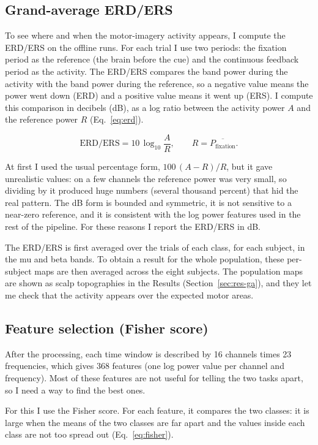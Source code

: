 \documentclass[10pt,twocolumn,a4paper]{article}
\begin{document}
\subsection{Grand-average ERD/ERS}
\label{sec:erd}
To see where and when the motor-imagery activity appears, I compute the ERD/ERS
on the offline runs. For each trial I use two periods: the fixation period as the
reference (the brain before the cue) and the continuous feedback period as the
activity. The ERD/ERS compares the band power during the activity with the band
power during the reference, so a negative value means the power went down (ERD)
and a positive value means it went up (ERS). I compute this comparison in
decibels (dB), as a log ratio between the activity power $A$ and the reference
power $R$ (Eq.~\ref{eq:erd}).

\begin{equation}
\label{eq:erd}
\mathrm{ERD/ERS} = 10\,\log_{10}\!\frac{A}{R},
\qquad R = \overline{P_{\text{fixation}}} .
\end{equation}

At first I used the usual percentage form, $100\,(A-R)/R$, but it gave
unrealistic values: on a few channels the reference power was very small, so
dividing by it produced huge numbers (several thousand percent) that hid the real
pattern. The dB form is bounded and symmetric, it is not sensitive to a
near-zero reference, and it is consistent with the log power features used in the
rest of the pipeline. For these reasons I report the ERD/ERS in dB.

The ERD/ERS is first averaged over the trials of each class, for each subject, in
the mu and beta bands. To obtain a result for the whole population, these
per-subject maps are then averaged across the eight subjects. The population maps
are shown as scalp topographies in the Results (Section~\ref{sec:res-ga}), and
they let me check that the activity appears over the expected motor areas.

\subsection{Feature selection (Fisher score)}
\label{sec:fisher}
After the processing, each time window is described by 16 channels times 23
frequencies, which gives 368 features (one log power value per channel and
frequency). Most of these features are not useful for telling the two tasks
apart, so I need a way to find the best ones.

For this I use the Fisher score. For each feature, it compares the two classes:
it is large when the means of the two classes are far apart and the values inside
each class are not too spread out (Eq.~\ref{eq:fisher}).
\end{document}
